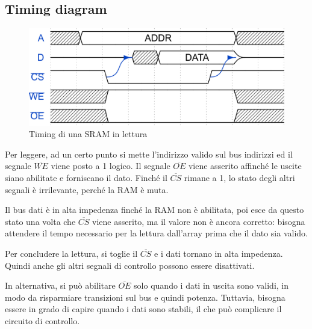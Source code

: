 \documentclass[11pt,4paper]{report}
\begin{document}
\pagebreak

\subsection{Timing diagram}
\begin{figure}[hbtp]
	\centering
	\includegraphics{memorie/sram_read.png}
	\caption{Timing di una SRAM in lettura}
	\label{fig:sram_read}
\end{figure}
Per leggere, ad un certo punto si mette l'indirizzo valido sul bus indirizzi ed il segnale $\overline{WE}$ viene posto a 1 logico. Il segnale $\overline{OE}$ viene asserito affinché le uscite siano abilitate e forniscano il dato. Finché il $\overline{CS}$ rimane a 1, lo stato degli altri segnali è irrilevante, perché la RAM è muta. 

Il bus dati è in alta impedenza finché la RAM non è abilitata, poi esce da questo stato una volta che $\overline{CS}$ viene asserito, ma il valore non è ancora corretto: bisogna attendere il tempo necessario per la lettura dall'array prima che il dato sia valido.

Per concludere la lettura, si toglie il $\overline{CS}$ e i dati tornano in alta impedenza. Quindi anche gli altri segnali di controllo possono essere disattivati.

In alternativa, si può abilitare $\overline{OE}$ solo quando i dati in uscita sono validi, in modo da risparmiare transizioni sul bus e quindi potenza. Tuttavia, bisogna essere in grado di capire quando i dati sono stabili, il che può complicare il circuito di controllo.
\end{document}
